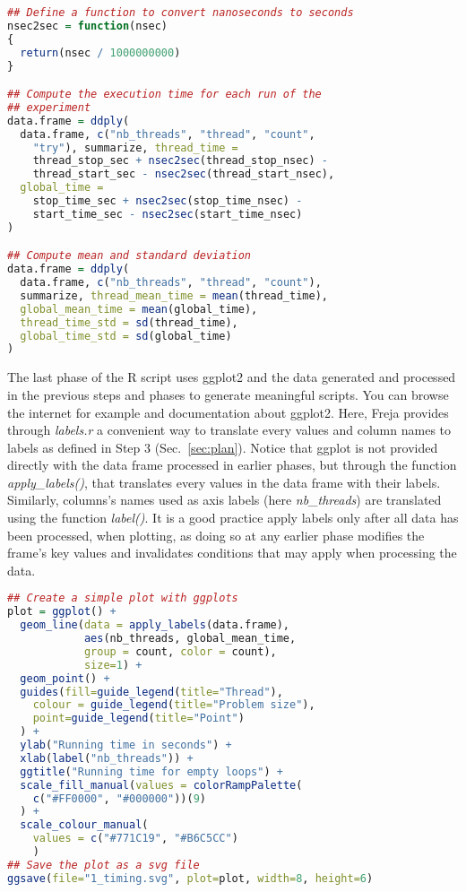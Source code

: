 \begin{lstlisting}[caption={R code to convert the time format returned by calls to clock\_gettime() into single numeric values in seconds, and computation of average and standard deviations of global and per-thread execution time.},label={lst:r_process},language=r]
## Define a function to convert nanoseconds to seconds
nsec2sec = function(nsec)
{
  return(nsec / 1000000000)
}

## Compute the execution time for each run of the
## experiment
data.frame = ddply(
  data.frame, c("nb_threads", "thread", "count",
  	"try"), summarize, thread_time = 
    thread_stop_sec + nsec2sec(thread_stop_nsec) -
    thread_start_sec - nsec2sec(thread_start_nsec),
  global_time = 
    stop_time_sec + nsec2sec(stop_time_nsec) -
    start_time_sec - nsec2sec(start_time_nsec)
)

## Compute mean and standard deviation
data.frame = ddply(
  data.frame, c("nb_threads", "thread", "count"),
  summarize, thread_mean_time = mean(thread_time),
  global_mean_time = mean(global_time),
  thread_time_std = sd(thread_time),
  global_time_std = sd(global_time)
)
\end{lstlisting}

The last phase of the R script uses ggplot2 and the data generated and processed in the previous steps and phases to generate meaningful scripts. You can browse the internet for example and documentation about ggplot2. Here, Freja provides through \emph{labels.r} a convenient way to translate every values and column names to labels as defined in Step 3 (Sec.~\ref{sec:plan}). Notice that ggplot is not provided directly with the data frame processed in earlier phases, but through the function \emph{apply\_labels()}, that translates every values in the data frame with their labels. Similarly, columns's names used as axis labels (here \emph{nb\_threads}) are translated using the function \emph{label()}. It is a good practice apply labels only after all data has been processed, when plotting, as doing so at any earlier phase modifies the frame's key values and invalidates conditions that may apply when processing the data.

\begin{lstlisting}[caption={Use of ggplots to produce a simple dotted curve showing the execution time as a function of number of threads, for problem sizes ranging from $10^8$ to $20^8$ jumps.},label={lst:r_plot},language=r]
## Create a simple plot with ggplots
plot = ggplot() +
  geom_line(data = apply_labels(data.frame),
            aes(nb_threads, global_mean_time,
            group = count, color = count),
            size=1) +
  geom_point() +
  guides(fill=guide_legend(title="Thread"),
  	colour = guide_legend(title="Problem size"),
  	point=guide_legend(title="Point")
  ) +
  ylab("Running time in seconds") +
  xlab(label("nb_threads")) +
  ggtitle("Running time for empty loops") + 
  scale_fill_manual(values = colorRampPalette(
  	c("#FF0000", "#000000"))(9)
  ) +
  scale_colour_manual(
  	values = c("#771C19", "#B6C5CC")
  	)
## Save the plot as a svg file
ggsave(file="1_timing.svg", plot=plot, width=8, height=6)
\end{lstlisting}

